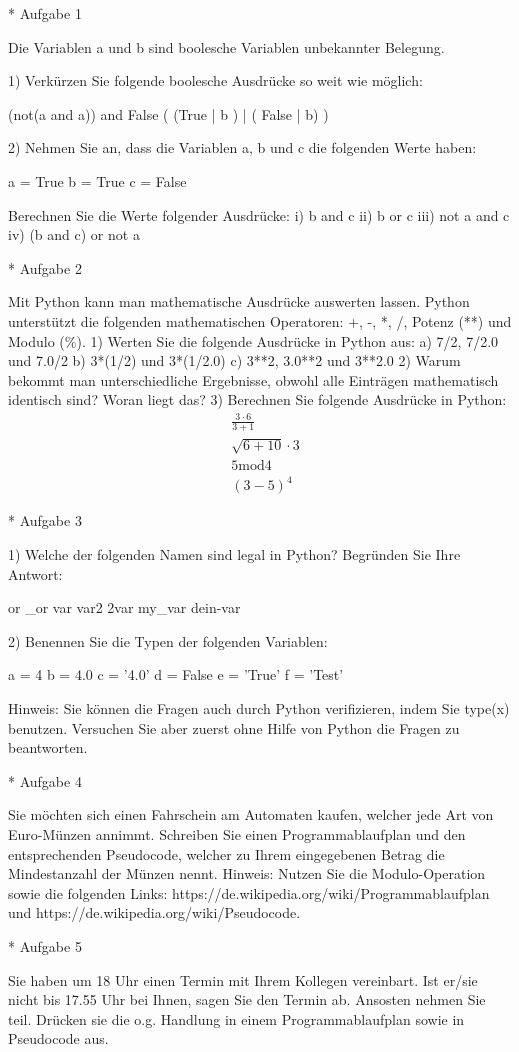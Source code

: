 * Aufgabe 1

Die Variablen a und b sind boolesche Variablen unbekannter Belegung. 

1) Verkürzen Sie folgende boolesche Ausdrücke so weit wie möglich: 

 (not(a and a)) and False
 ( (True | b ) | ( False | b) )
 
2) Nehmen Sie an, dass die Variablen a, b und c die folgenden Werte haben: 
 
 a = True
 b = True
 c = False
 
Berechnen Sie die Werte folgender Ausdrücke:
i) b and c
ii) b or c
iii) not a and c
iv) (b and c) or not a

* Aufgabe 2

Mit Python kann man mathematische Ausdrücke auswerten lassen. Python unterstützt die folgenden mathematischen Operatoren: +, -, *, /, Potenz (**) und Modulo (\%).   
1) Werten Sie die folgende Ausdrücke in Python aus: 
a) 7/2, 7/2.0 und 7.0/2
b) 3*(1/2) und 3*(1/2.0)
c) 3**2, 3.0**2 und 3**2.0
2) Warum bekommt man unterschiedliche Ergebnisse, obwohl alle Einträgen mathematisch identisch sind? Woran liegt das?
3) Berechnen Sie folgende Ausdrücke in Python: 
\begin{align}
&\frac{3 \cdot 6}{3 + 1}\\
&\sqrt{6+10} \cdot 3 \\
&5 \text{mod} 4 \\
&(3-5)^4
\end{align}

* Aufgabe 3

1) Welche der folgenden Namen sind legal in Python? Begründen Sie Ihre Antwort: 

or
_or
var
var2
2var
my_var
dein-var

2) Benennen Sie die Typen der folgenden Variablen:

a = 4
b = 4.0
c = '4.0'
d = False
e = 'True'
f = 'Test'

Hinweis: Sie können die Fragen auch durch Python verifizieren, indem Sie type(x) benutzen. Versuchen Sie aber zuerst ohne Hilfe von Python die Fragen zu beantworten.   

* Aufgabe 4

Sie möchten sich einen Fahrschein am Automaten kaufen, welcher jede Art von Euro-Münzen annimmt. Schreiben Sie einen Programmablaufplan und den entsprechenden Pseudocode, welcher zu Ihrem eingegebenen Betrag die Mindestanzahl der Münzen nennt. 
Hinweis: Nutzen Sie die Modulo-Operation sowie die folgenden Links: https://de.wikipedia.org/wiki/Programmablaufplan und https://de.wikipedia.org/wiki/Pseudocode.

* Aufgabe 5

Sie haben um 18 Uhr einen Termin mit Ihrem Kollegen vereinbart. Ist er/sie nicht bis 17.55 Uhr bei Ihnen, sagen Sie den Termin ab. Ansosten nehmen Sie teil. Drücken sie die o.g. Handlung in einem Programmablaufplan sowie in Pseudocode aus.

